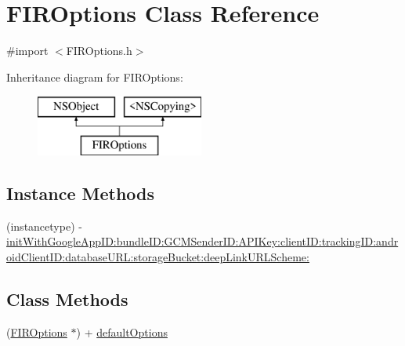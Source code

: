 \hypertarget{interface_f_i_r_options}{}\section{F\+I\+R\+Options Class Reference}
\label{interface_f_i_r_options}


{\ttfamily \#import $<$F\+I\+R\+Options.\+h$>$}

Inheritance diagram for F\+I\+R\+Options\+:\begin{figure}[H]
\begin{center}
\leavevmode
\includegraphics[height=2.000000cm]{interface_f_i_r_options}
\end{center}
\end{figure}
\subsection*{Instance Methods}
\begin{DoxyCompactItemize}
\item 
(instancetype) -\/ \hyperlink{interface_f_i_r_options_a2d8b5a47df90465b96716edbe3540d02}{init\+With\+Google\+App\+I\+D\+:bundle\+I\+D\+:\+G\+C\+M\+Sender\+I\+D\+:\+A\+P\+I\+Key\+:client\+I\+D\+:tracking\+I\+D\+:android\+Client\+I\+D\+:database\+U\+R\+L\+:storage\+Bucket\+:deep\+Link\+U\+R\+L\+Scheme\+:}
\end{DoxyCompactItemize}
\subsection*{Class Methods}
\begin{DoxyCompactItemize}
\item 
(\hyperlink{interface_f_i_r_options}{F\+I\+R\+Options} $\ast$) + \hyperlink{interface_f_i_r_options_a13fd9fe117657639406aa33462447397}{default\+Options}
\end{DoxyCompactItemize}
